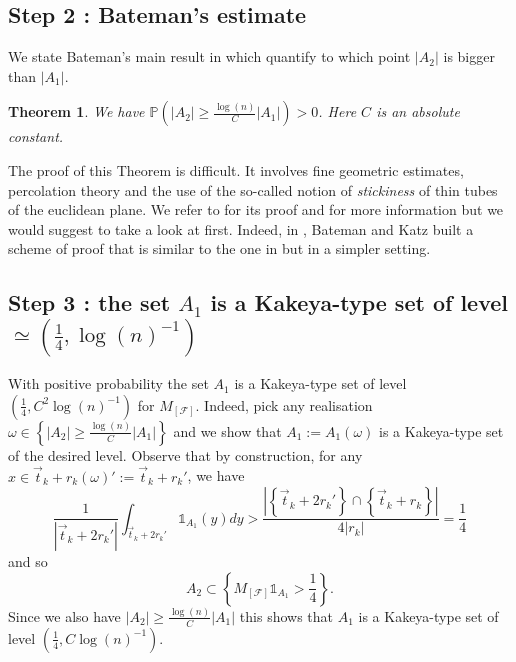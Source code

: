 \documentclass{article}
\newtheorem{thm}{Theorem}
\begin{document}
\subsection*{Step 2 : Bateman's estimate}


We state Bateman's main result in \cite{BATEMAN} which quantify to which point $|A_2|$ is bigger than $|A_1|$.

\begin{thm}\label{T : Main theorem Bateman}
We have $\mathbb{P}\left(\left|A_2\right| \geq \frac{\log(n)}{ C}|A_1|\right) > 0$. Here $C$ is an absolute constant.
\end{thm}

The proof of this Theorem is difficult. It involves fine geometric estimates, percolation theory and the use of the so-called notion of \textit{stickiness} of thin tubes of the euclidean plane. We refer to \cite{BATEMAN} for its proof and for more information but we would suggest to take a look at \cite{BATEMANKATZ} first. Indeed, in \cite{BATEMANKATZ}, Bateman and Katz built a scheme of proof that is similar to the one in \cite{BATEMAN} but in a simpler setting.
 

\subsection*{Step 3 : the set $A_1$ is a Kakeya-type set of level $\simeq (\frac{1}{4}, \log(n)^{-1})$}

With positive probability the set $A_1$ is a Kakeya-type set of level $(\frac{1}{4}, C^2\log(n)^{-1})$ for $M_{[\mathcal{F}]}$. Indeed, pick any realisation $\omega \in  \left\{ \left|A_2\right| \geq \frac{ \log(n)}{ C} |A_1| \right\}$ and we show that $A_1 := A_1(\omega)$ is a Kakeya-type set of the desired level. Observe that by construction, for any $x \in \Vec{t}_k + r_k(\omega)' := \Vec{t}_k + r_k'$, we have $$\frac{1}{|\Vec{t}_k + 2r_k'|} \int_{\Vec{t}_k + 2r_k'} \mathbb{1}_{A_1}(y)dy > \frac{| \left\{\Vec{t}_k + 2r_k' \right\} \cap \left\{\Vec{t}_k + r_k \right\}|}{4|r_k|} = \frac{1}{4} $$ and so $$A_2 \subset \left\{ M_{[\mathcal{F}]}\mathbb{1}_{A_1} > \frac{1}{4} \right\}.$$ Since we also have $|A_2| \geq \frac{\log(n)}{C} |A_1|$ this shows that $A_1$ is a Kakeya-type set of level $(\frac{1}{4}, C\log(n)^{-1})$.
\end{document}
